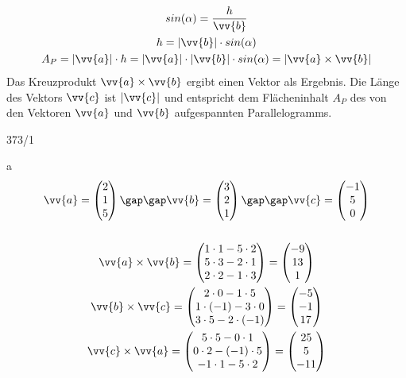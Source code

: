 \begin{gather*}
  sin(\alpha) = \frac{h}{\vv{b}} \\
  h = |\vv{b}| \cdot sin(\alpha) \\
  A_P = |\vv{a}| \cdot h = |\vv{a}| \cdot |\vv{b}| \cdot sin(\alpha) = |\vv{a} \times \vv{b}|
\end{gather*}
Das Kreuzprodukt $\vv{a} \times \vv{b}$ ergibt einen Vektor als Ergebnis. Die Länge des Vektors $\vv{c}$ ist $|\vv{c}|$ und entspricht dem Flächeninhalt $A_P$ des von den Vektoren $\vv{a}$ und $\vv{b}$ aufgespannten Parallelogramms.
\begin{exercise}{373/1}
  \item [a]
  \begin{gather*}
    \vv{a} = \begin{pmatrix}2 \\ 1 \\ 5\end{pmatrix} \gap\gap \vv{b} = \begin{pmatrix}3 \\ 2 \\ 1\end{pmatrix} \gap\gap \vv{c} = \begin{pmatrix}-1 \\ 5 \\ 0\end{pmatrix} \\\\
    \vv{a} \times \vv{b} = \begin{pmatrix}1 \cdot 1 - 5 \cdot 2 \\ 5 \cdot 3 - 2 \cdot 1 \\ 2 \cdot 2 - 1 \cdot 3\end{pmatrix} = \begin{pmatrix}-9 \\ 13 \\ 1\end{pmatrix} \\
    \vv{b} \times \vv{c} = \begin{pmatrix}2 \cdot 0 - 1 \cdot 5 \\ 1 \cdot (-1) - 3 \cdot 0 \\ 3 \cdot 5 - 2 \cdot (-1)\end{pmatrix} = \begin{pmatrix}-5 \\ -1 \\ 17\end{pmatrix} \\
    \vv{c} \times \vv{a} = \begin{pmatrix}5 \cdot 5 - 0 \cdot 1 \\ 0 \cdot 2 - (-1) \cdot 5 \\ -1 \cdot 1 - 5 \cdot 2\end{pmatrix} = \begin{pmatrix}25 \\ 5 \\ -11\end{pmatrix}
  \end{gather*}
\end{exercise}
